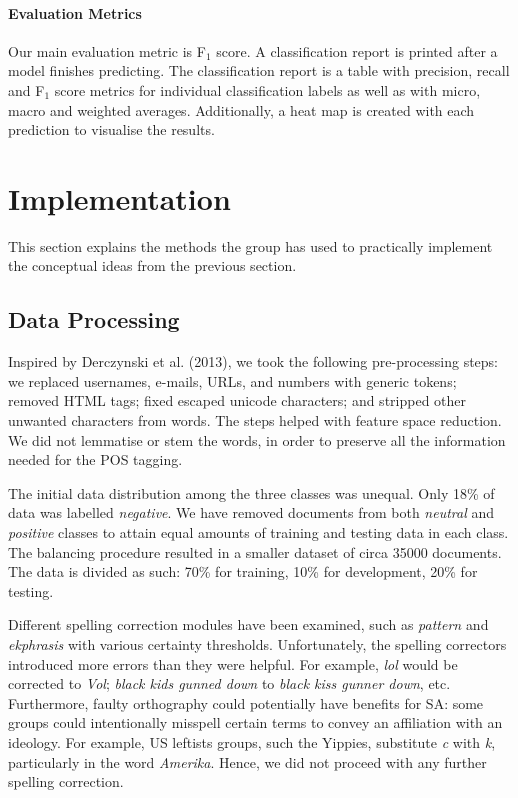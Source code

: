 \documentclass[titlepage]{article}
\begin{document}
      
      \paragraph{Evaluation Metrics}
Our main evaluation metric is F$_{1}$ score. A classification report is printed after a model finishes predicting. The classification report is a table with precision, recall and F$_{1}$ score metrics for individual classification labels as well as with micro, macro and weighted averages. Additionally, a heat map is created with each prediction to visualise the results.


\section{Implementation}

This section explains the methods the group has used to practically implement the conceptual ideas from the previous section.

      \subsection{Data Processing}
      
     Inspired by Derczynski et al. (2013), we took the following pre-processing steps: we replaced usernames, e-mails, URLs, and numbers with generic tokens; removed HTML tags; fixed escaped unicode characters; and stripped other unwanted characters from words. The steps helped with feature space reduction. We did not lemmatise or stem the words, in order to preserve all the information needed for the POS tagging.
     
     The initial data distribution among the three classes was unequal. Only 18\% of data was labelled \textit{negative}. We have removed documents from both \textit{neutral} and \textit{positive} classes to attain equal amounts of training and testing data in each class. The balancing procedure resulted in a smaller dataset of circa 35000 documents. The data is divided as such: 70\% for training, 10\% for development, 20\% for testing. 

     
     Different spelling correction modules have been examined, such as \textit{pattern} \citep{pattern} and  \textit{ekphrasis} \citep{ekphrasis} with various certainty thresholds. Unfortunately, the spelling correctors introduced more errors than they were helpful. For example, \textit{lol} would be corrected to \textit{Vol}; \textit{black kids gunned down} to \textit{black kiss gunner down}, etc. Furthermore, faulty orthography could potentially have benefits for SA: some groups could intentionally misspell certain terms to convey an affiliation with an ideology. For example, US leftists groups, such the Yippies, substitute \textit{c} with \textit{k}, particularly in the word \textit{Amerika}. Hence, we did not proceed with any further spelling correction. 
     
\end{document}
